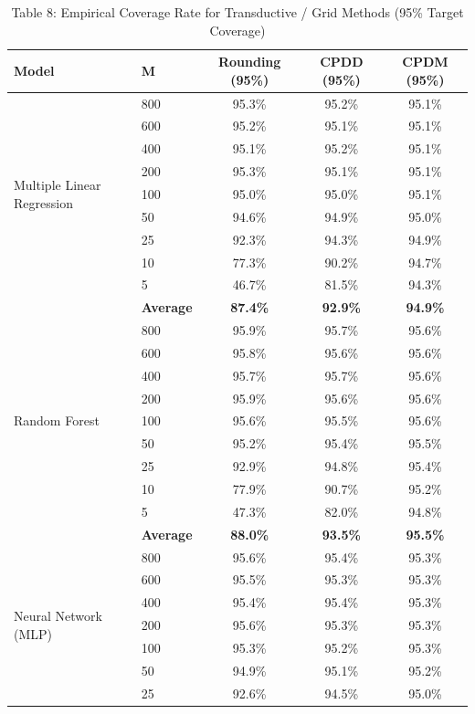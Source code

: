 \documentclass[11pt,a4paper]{article}
\begin{document}
\begin{table}[H]
\centering
\caption{Table 8: Empirical Coverage Rate for Transductive / Grid Methods (95\% Target Coverage)}
\label{tab:team_tab8}
\scriptsize
\begin{tabular}{llccc}
\toprule
Model & M & Rounding (95\%) & CPDD (95\%) & CPDM (95\%) \\
\midrule
\multirow{9}{*}{Multiple Linear Regression}
 & 800 & 95.3\% & 95.2\% & 95.1\% \\
 & 600 & 95.2\% & 95.1\% & 95.1\% \\
 & 400 & 95.1\% & 95.2\% & 95.1\% \\
 & 200 & 95.3\% & 95.1\% & 95.1\% \\
 & 100 & 95.0\% & 95.0\% & 95.1\% \\
 & 50  & 94.6\% & 94.9\% & 95.0\% \\
 & 25  & 92.3\% & 94.3\% & 94.9\% \\
 & 10  & 77.3\% & 90.2\% & 94.7\% \\
 & 5   & 46.7\% & 81.5\% & 94.3\% \\
 & \textbf{Average} & \textbf{87.4\%} & \textbf{92.9\%} & \textbf{94.9\%} \\
\midrule
\multirow{9}{*}{Random Forest}
 & 800 & 95.9\% & 95.7\% & 95.6\% \\
 & 600 & 95.8\% & 95.6\% & 95.6\% \\
 & 400 & 95.7\% & 95.7\% & 95.6\% \\
 & 200 & 95.9\% & 95.6\% & 95.6\% \\
 & 100 & 95.6\% & 95.5\% & 95.6\% \\
 & 50  & 95.2\% & 95.4\% & 95.5\% \\
 & 25  & 92.9\% & 94.8\% & 95.4\% \\
 & 10  & 77.9\% & 90.7\% & 95.2\% \\
 & 5   & 47.3\% & 82.0\% & 94.8\% \\
 & \textbf{Average} & \textbf{88.0\%} & \textbf{93.5\%} & \textbf{95.5\%} \\
\midrule
\multirow{9}{*}{Neural Network (MLP)}
 & 800 & 95.6\% & 95.4\% & 95.3\% \\
 & 600 & 95.5\% & 95.3\% & 95.3\% \\
 & 400 & 95.4\% & 95.4\% & 95.3\% \\
 & 200 & 95.6\% & 95.3\% & 95.3\% \\
 & 100 & 95.3\% & 95.2\% & 95.3\% \\
 & 50  & 94.9\% & 95.1\% & 95.2\% \\
 & 25  & 92.6\% & 94.5\% & 95.0\% \\

\end{tabular}
\end{table}
\end{document}
